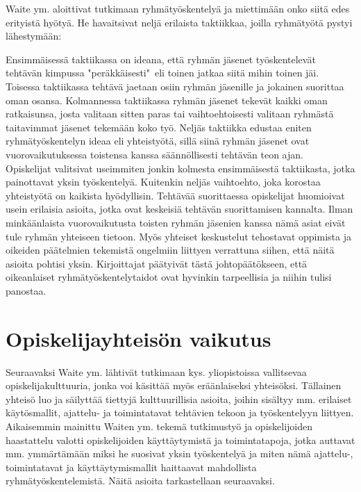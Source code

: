 \documentclass[finnish]{article}
\begin{document}
Waite ym. aloittivat tutkimaan ryhmätyöskentelyä ja miettimään onko siitä edes erityistä hyötyä. He havaitsivat neljä erilaista taktiikkaa, joilla ryhmätyötä pystyi lähestymään:

Ensimmäisessä taktiikassa on ideana, että ryhmän jäsenet työskentelevät tehtävän kimpussa "peräkkäisesti"~eli toinen jatkaa siitä mihin toinen jäi. Toisessa taktiikassa tehtävä jaetaan osiin ryhmän jäsenille ja jokainen suorittaa oman osansa. Kolmannessa taktiikassa ryhmän jäsenet tekevät kaikki oman ratkaisunsa, josta valitaan sitten paras tai vaihtoehtoisesti valitaan ryhmästä taitavimmat jäsenet tekemään koko työ. Neljäs taktiikka edustaa eniten ryhmätyöskentelyn ideaa eli yhteistyötä, sillä siinä ryhmän jäsenet ovat vuorovaikutuksessa toistensa kanssa säännöllisesti tehtävän teon ajan.\\

Opiskelijat valitsivat useimmiten jonkin kolmesta ensimmäisestä taktiikasta, jotka painottavat yksin työskentelyä. Kuitenkin neljäs vaihtoehto, joka korostaa yhteistyötä on kaikista hyödyllisin. Tehtävää suorittaessa opiskelijat huomioivat usein erilaisia asioita, jotka ovat keskeisiä tehtävän suorittamisen kannalta. Ilman minkäänlaista vuorovaikutusta toisten ryhmän jäsenien kanssa nämä asiat eivät tule ryhmän yhteiseen tietoon. Myös yhteiset keskustelut tehostavat oppimista ja oikeiden päätelmien tekemistä ongelmiin liittyen verrattuna siihen, että näitä asioita pohtisi yksin. Kirjoittajat päätyivät tästä johtopäätökseen, että oikeanlaiset ryhmätyöskentelytaidot ovat hyvinkin tarpeellisia ja niihin tulisi panostaa.

\section{Opiskelijayhteisön vaikutus}

Seuraavaksi Waite ym. lähtivät tutkimaan kys. yliopistoissa vallitsevaa opiskelijakulttuuria, jonka voi käsittää myös eräänlaiseksi yhteisöksi. Tällainen yhteisö luo ja säilyttää tiettyjä kulttuurillisia asioita, joihin sisältyy mm. erilaiset käytösmallit, ajattelu- ja toimintatavat tehtävien tekoon ja työskentelyyn liittyen. Aikaisemmin mainittu Waiten ym. tekemä tutkimustyö ja opiskelijoiden haastattelu valotti opiskelijoiden käyttäytymistä ja toimintatapoja, jotka auttavat mm. ymmärtämään miksi he suosivat yksin työskentelyä ja miten nämä ajattelu-, toimintatavat ja käyttäytymismallit haittaavat mahdollista ryhmätyöskentelemistä. Näitä asioita tarkastellaan seuraavaksi.
\end{document}
